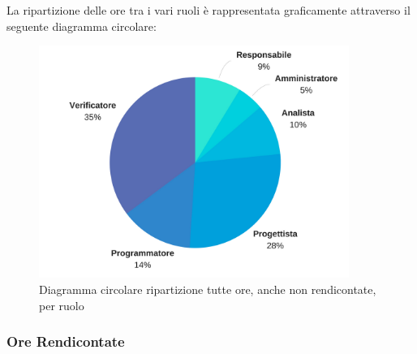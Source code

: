 			
			La ripartizione delle ore tra i vari ruoli è rappresentata graficamente 
			attraverso il seguente diagramma circolare:
			
			\begin{figure}[H] 
				\centering 
				\includegraphics[width=0.9\textwidth]{images/CircolareTotale.png} 
				\caption{Diagramma circolare ripartizione tutte ore, anche non rendicontate, per ruolo}
				\label{CircolareTotale}
			\end{figure}
			
			\subsubsection{Ore Rendicontate}
			
